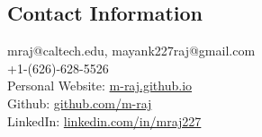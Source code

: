 \documentclass[margin, line]{res}
\begin{document}
\begin{resume}

\section{\sc Contact Information}

\begin{minipage}[t]{\linewidth}
mraj@caltech.edu, mayank227raj@gmail.com\\
+1-(626)-628-5526\\
Personal Website: \href{https://m-raj.github.io}{m-raj.github.io}\\
Github: \href{https://github.com/m-raj}{github.com/m-raj}\\
LinkedIn: \href{https://www.linkedin.com/in/mraj227}{linkedin.com/in/mraj227}
\end{minipage}








% 

% 

% 
\end{resume}
\end{document}
